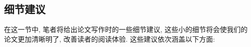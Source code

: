 \documentclass{booki}
\begin{document}
\subsection{细节建议}
{在这一节中, 笔者将给出论文写作时的一些细节建议, 这些小的细节将会使我们的论文更加清晰明了, 改善读者的阅读体验. 这些建议依次涵盖以下方面:}
{\begin{center}
    \noindent{}
\end{center}}
\end{document}
